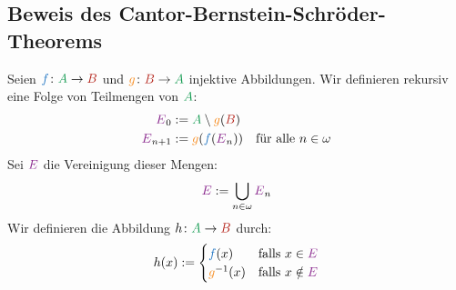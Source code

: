 \subsection{Beweis des Cantor-Bernstein-Schröder-Theorems}
\begin{math-stroke}
\begin{short-proof}
Seien $\textcolor{RoyalBlue}{f} \colon \textcolor{ForestGreen}{A} \to \textcolor{BrickRed}{B}$ und $\textcolor{BurntOrange}{g} \colon \textcolor{BrickRed}{B} \to \textcolor{ForestGreen}{A}$ injektive Abbildungen.
Wir definieren rekursiv eine Folge von Teilmengen von $\textcolor{ForestGreen}{A}$:
\begin{align*}
\textcolor{Fuchsia}{E}_0 &:= \textcolor{ForestGreen}{A} \setminus \textcolor{BurntOrange}{g}(\textcolor{BrickRed}{B}) \\
\textcolor{Fuchsia}{E}_{n+1} &:= \textcolor{BurntOrange}{g}(\textcolor{RoyalBlue}{f}(\textcolor{Fuchsia}{E}_n)) \quad \text{für alle } n \in \omega
\end{align*}
Sei $\textcolor{Fuchsia}{E}$ die Vereinigung dieser Mengen:
\[
\textcolor{Fuchsia}{E} := \bigcup_{n \in \omega} \textcolor{Fuchsia}{E}_n
\]
Wir definieren die Abbildung $h \colon \textcolor{ForestGreen}{A} \to \textcolor{BrickRed}{B}$ durch:
\[
h(x) := \begin{cases}
\textcolor{RoyalBlue}{f}(x) & \text{falls } x \in \textcolor{Fuchsia}{E} \\
\textcolor{BurntOrange}{g}^{-1}(x) & \text{falls } x \notin \textcolor{Fuchsia}{E}
\end{cases}
\]

\begin{center}
\end{center}
\end{short-proof}
\end{math-stroke}
